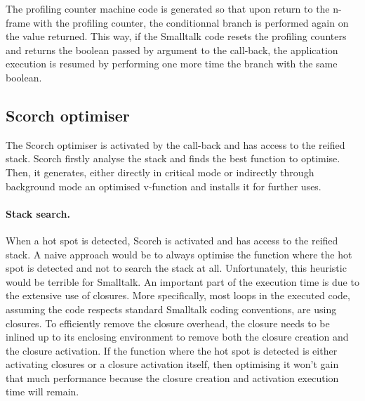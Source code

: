 \documentclass[a4paper,12pt,twoside]{../includes/ThesisStyle}
\begin{document}

The profiling counter machine code is generated so that upon return to the n-frame with the profiling counter, the conditionnal branch is performed again on the value returned. This way, if the Smalltalk code resets the profiling counters and returns the boolean passed by argument to the call-back, the application execution is resumed by performing one more time the branch with the same boolean.


\subsection{Scorch optimiser}

The Scorch optimiser is activated by the call-back and has access to the reified stack. Scorch firstly analyse the stack and finds the best function to optimise. Then, it generates, either directly in critical mode or indirectly through background mode an optimised v-function and installs it for further uses.


\paragraph{Stack search.}
\label{ss:stackSearch}

When a hot spot is detected, Scorch is activated and has access to the reified stack. A naive approach would be to always optimise the function where the hot spot is detected and not to search the stack at all. Unfortunately, this heuristic would be terrible for Smalltalk. An important part of the execution time is due to the extensive use of closures. More specifically, most loops in the executed code, assuming the code respects standard Smalltalk coding conventions, are using closures. To efficiently remove the closure overhead, the closure needs to be inlined up to its enclosing environment to remove both the closure creation and the closure activation. If the function where the hot spot is detected is either activating closures or a closure activation itself, then optimising it won't gain that much performance because the closure creation and activation execution time will remain.
\end{document}
